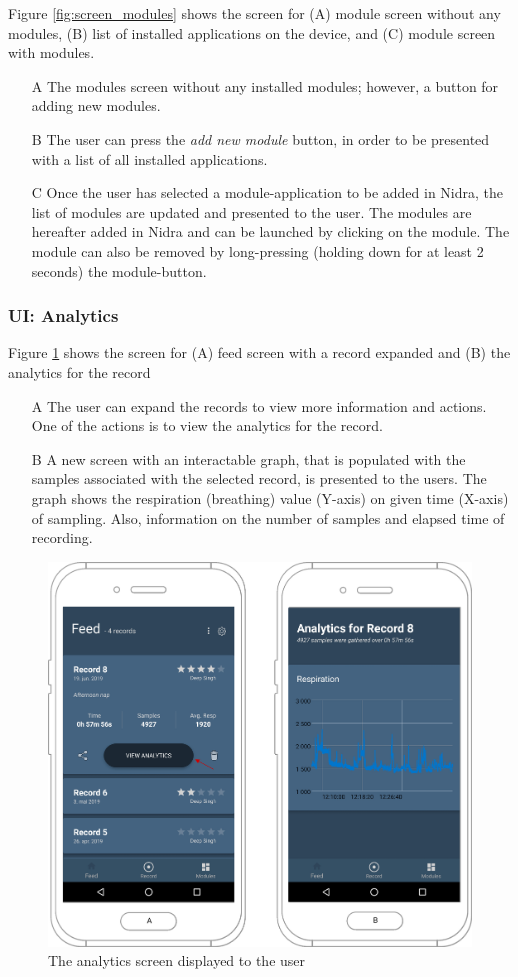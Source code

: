 Figure \ref{fig:screen_modules} shows the screen for (A) module screen without any modules, (B) list of installed applications on the device, and (C) module screen with modules. 

\begin{itemize}
    \item[A] The modules screen without any installed modules; however, a button for adding new modules.
    \item[B] The user can press the \textit{add new module} button, in order to be presented with a list of all installed applications. 
    \item[C] Once the user has selected a module-application to be added in Nidra, the list of modules are updated and presented to the user. The modules are hereafter added in Nidra and can be launched by clicking on the module. The module can also be removed by long-pressing (holding down for at least 2 seconds) the module-button.
\end{itemize}

\subsubsection{UI: Analytics}
Figure \ref{fig:screen_analytics} shows the screen for (A) feed screen with a record expanded and (B) the analytics for the record

\begin{itemize}
    \item[A] The user can expand the records to view more information and actions. One of the actions is to view the analytics for the record.
    \item[B] A new screen with an interactable graph, that is populated with the samples associated with the selected record, is presented to the users. The graph shows the respiration (breathing) value (Y-axis) on given time (X-axis) of sampling. Also, information on the number of samples and elapsed time of recording. 
\end{itemize}

\begin{figure}[!h]
    \centering
    \includegraphics[scale=0.26]{images/Analytics_img.pdf}
    \caption{The analytics screen displayed to the user}
    \label{fig:screen_analytics}
\end{figure}

